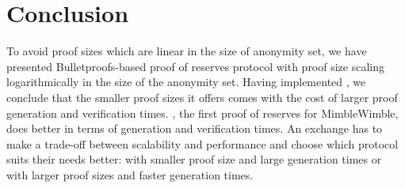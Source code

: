   \section{Conclusion}
  To avoid proof sizes which are linear in the size of anonymity set, we have presented Bulletproofs-based proof of reserves protocol \RB with proof size scaling logarithmically in the size of the anonymity set.
  Having implemented \RBw, we conclude that the smaller proof sizes it offers comes with the cost of larger proof generation and verification times.
  \Rw, the first proof of reserves for MimbleWimble, does better in terms of generation and verification times.
  An exchange has to make a trade-off between scalability and performance and choose which protocol suits their needs better: \RB with smaller proof size and large generation times or \R with larger proof sizes and faster generation times. 
  
  
  
  
  
  
